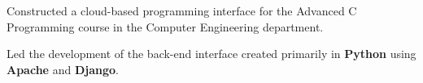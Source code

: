 \documentclass[letterpaper]{deedy-resume} %
\begin{document}
\begin{minipage}[t]{0.66\textwidth}
\begin{tightitemize}
\item Constructed a cloud-based programming interface for the Advanced C Programming course in the Computer Engineering department.
\item Led the development of the back-end interface created primarily in \textbf{Python} using \textbf{Apache} and \textbf{Django}.
\end{tightitemize}

\sectionspace %




\sectionspace %


\end{minipage} %
\end{document}
